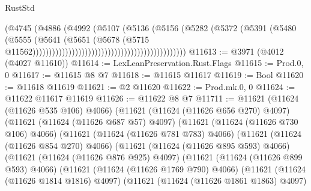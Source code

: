 \begin{lexlean}{RustStd}
\begin{coremodule}
                                                                    (@4745
                                                                      (@4886
                                                                        (@4992
                                                                          (@5107
                                                                            (@5136
                                                                              (@5156
                                                                                (@5282
                                                                                  (@5372
                                                                                    (@5391
                                                                                      (@5480
                                                                                        (@5555
                                                                                          (@5641
                                                                                            (@5651
                                                                                              (@5678
                                                                                                (@5715
                                                                                                  @11562)))))))))))))))))))))))))))))))))))))))))))))))
@11613 := @3971 (@4012 (@4027 @11610))
@11614 := LexLeanPreservation.Rust.Flags
@11615 := Prod.{0, 0}
@11617 := @11615 @8 @7
@11618 := @11615 @11617
@11619 := Bool
@11620 := @11618 @11619
@11621 := @2 @11620
@11622 := Prod.mk.{0, 0}
@11624 := @11622 @11617 @11619
@11626 := @11622 @8 @7
@11711 := @11621
    (@11624 (@11626 @535 @106) @4066)
    (@11621
      (@11624 (@11626 @656 @270) @4097)
      (@11621
        (@11624 (@11626 @687 @57) @4097)
        (@11621
          (@11624 (@11626 @730 @106) @4066)
          (@11621
            (@11624 (@11626 @781 @783) @4066)
            (@11621
              (@11624 (@11626 @854 @270) @4066)
              (@11621
                (@11624 (@11626 @895 @593) @4066)
                (@11621
                  (@11624 (@11626 @876 @925) @4097)
                  (@11621
                    (@11624 (@11626 @899 @593) @4066)
                    (@11621
                      (@11624 (@11626 @1769 @790) @4066)
                      (@11621
                        (@11624 (@11626 @1814 @1816) @4097)
                        (@11621
                          (@11624 (@11626 @1861 @1863) @4097)

\end{coremodule}
\end{lexlean}
